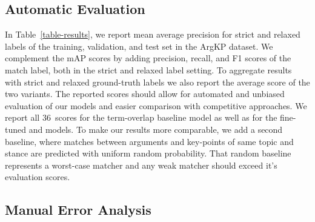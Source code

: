 \subsection{Automatic Evaluation}

In Table~\ref{table-results}, we report mean average precision for strict and relaxed labels of the training, validation, and test set in the ArgKP dataset.
We complement the mAP scores by adding precision, recall, and F1 scores of the match label, both in the strict and relaxed label setting.
To aggregate results with strict and relaxed ground-truth labels we also report the average score of the two variants.
The reported scores should allow for automated and unbiased evaluation of our models and easier comparison with competitive approaches.
We report all 36~scores for the term-overlap baseline model as well as for the fine-tuned \BertBase and \RobertaBase models.
To make our results more comparable, we add a second baseline, where matches between arguments and key-points of same topic and stance are predicted with uniform random probability.
That random baseline represents a worst-case matcher and any weak matcher should exceed it's evaluation scores.


\subsection{Manual Error Analysis}


